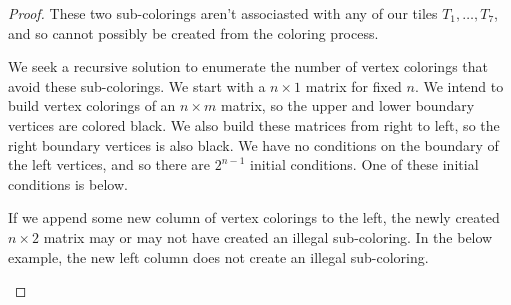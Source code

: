 \documentclass[12pt]{article}
\theoremstyle{plain}
\theoremstyle{definition}
\theoremstyle{remark}
\theoremstyle{definition}
\newcommand{\cell}[4]{ \draw[thick] ( #1 , #2 ) rectangle ( #3 , #4 );}
\begin{document}
\begin{proof}
These two sub-colorings aren't associasted with any of our tiles $T_1, \dots, T_7$, and so cannot possibly be created from the coloring process. 

We seek a recursive solution to enumerate the number of vertex colorings that avoid these sub-colorings. We start with a $n \times 1$ matrix for fixed $n$. We intend to build vertex colorings of an $n \times m$ matrix, so the upper and lower boundary vertices are colored black. We also build these matrices from right to left, so the right boundary vertices is also black. We have no conditions on the boundary of the left vertices, and so there are $2^{n-1}$ initial conditions. One of these initial conditions is below.

\begin{center}
\end{center}

If we append some new column of vertex colorings to the left, the newly created $n \times 2$ matrix may or may not have created an illegal sub-coloring. In the below example, the new left column does not create an illegal sub-coloring.  

\begin{center}
\end{center}
\end{proof}
\end{document}
